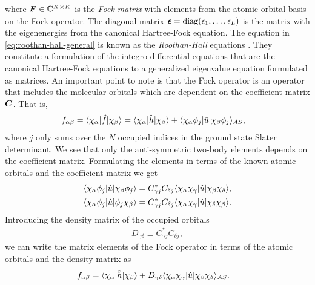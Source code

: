             where $\boldsymbol{F} \in \mathbb{C}^{K \times K}$ is the \emph{Fock
            matrix} with elements from the atomic orbital basis on the Fock
            operator.
            The diagonal matrix $\boldsymbol{\epsilon} = \operatorname{diag}(\epsilon_1, \dots,
            \epsilon_L)$ is the matrix with the eigenenergies from the canonical
            Hartree-Fock equation.
            The equation in \autoref{eq:roothan-hall-general} is known as the
            \emph{Roothan-Hall} equations \cite{roothan, hall}.
            They constitute a formulation of the integro-differential equations
            that are the canonical Hartree-Fock equations to a generalized
            eigenvalue equation formulated as matrices.
            An important point to note is that the Fock operator is an operator
            that includes the molecular orbitals which are dependent on the
            coefficient matrix $\boldsymbol{C}$.
            That is,
            \begin{align}
                f_{\alpha\beta}
                &= \langle \chi_{\alpha} |\hat{f}| \chi_{\beta} \rangle
                = \langle \chi_{\alpha} |\hat{h}| \chi_{\beta} \rangle
                +
                \langle \chi_{\alpha}\phi_j |\hat{u}| \chi_{\beta}\phi_j \rangle_{AS},
            \end{align}
            where $j$ only sums over the $N$ occupied indices in the ground state
            Slater determinant.
            We see that only the anti-symmetric two-body elements depends on the
            coefficient matrix.
            Formulating the elements in terms of the known atomic orbitals and
            the coefficient matrix we get
            \begin{align}
                \langle \chi_{\alpha}\phi_j |\hat{u}| \chi_{\beta}\phi_j \rangle
                &=
                C^{*}_{\gamma j} C_{\delta j}
                \langle \chi_{\alpha}\chi_{\gamma} |\hat{u}| \chi_{\beta}\chi_{\delta} \rangle,
                \\
                \langle \chi_{\alpha}\phi_j |\hat{u}| \phi_j\chi_{\beta} \rangle
                &=
                C^{*}_{\gamma j} C_{\delta j}
                \langle \chi_{\alpha}\chi_{\gamma} |\hat{u}| \chi_{\delta}\chi_{\beta} \rangle.
            \end{align}
            Introducing the density matrix of the occupied orbitals
            \begin{align}
                D_{\gamma\delta} \equiv
                C^{*}_{\gamma j} C_{\delta j},
            \end{align}
            we can write the matrix elements of the Fock operator in terms of
            the atomic orbitals and the density matrix as
            \begin{align}
                f_{\alpha\beta}
                &= \langle \chi_{\alpha} |\hat{h}| \chi_{\beta} \rangle
                +
                D_{\gamma\delta}
                \langle \chi_{\alpha}\chi_{\gamma} |\hat{u}| \chi_{\beta}\chi_{\delta} \rangle_{AS}.
            \end{align}

